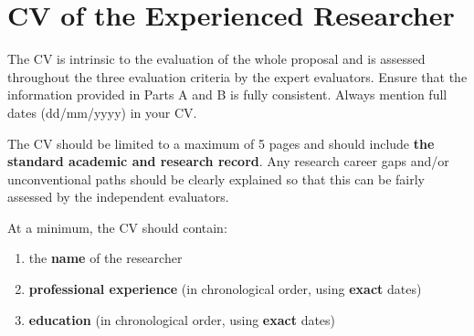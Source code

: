 
\newpage
{}
\section{CV of the Experienced Researcher}
\label{sec:cv}

The CV is intrinsic to the evaluation of the whole proposal and is
assessed throughout the three evaluation criteria by the expert
evaluators. Ensure that the information provided in Parts A and B
is fully consistent. Always mention full dates (dd/mm/yyyy) in
your CV.

\medskip\noindent

The CV should be limited to a maximum of 5 pages and should
include \textbf{the standard academic and research record}. Any
research career gaps and/or unconventional paths should be clearly
explained so that this can be fairly assessed by the independent
evaluators.

At a minimum, the CV should contain:

\begin{enumerate}
  \item the \textbf{name} of the researcher
  \item \textbf{professional experience} (in chronological order,
  using \textbf{exact} dates)
  \item \textbf{education} (in chronological order, using
  \textbf{exact} dates)
\end{enumerate}

\medskip\noindent

